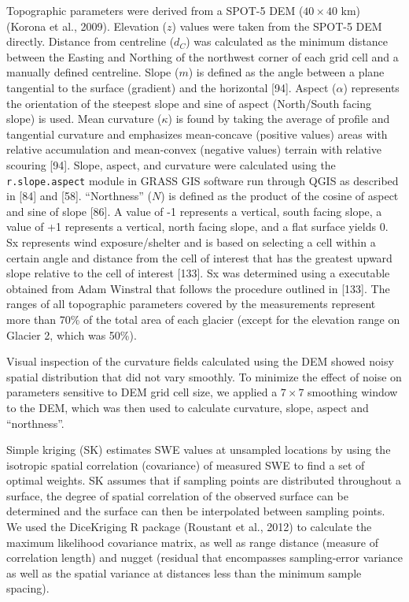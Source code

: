 \documentclass[twoside,twocolumn]{article}
\begin{document}
Topographic parameters were derived from a SPOT-5 DEM ($40\times40$ km) (Korona et al., 2009). Elevation ($z$) values were taken from the SPOT-5 DEM directly. Distance from centreline ($d_C$) was calculated as the minimum distance between the Easting
and Northing of the northwest corner of each grid cell and a manually defined centreline. Slope ($m$) is defined as the angle between a plane tangential to the surface (gradient) and the horizontal [94]. Aspect ($\alpha$) represents the orientation of the steepest slope and sine of aspect (North/South facing slope) is used. Mean curvature ($\kappa$) is found by taking the average of profile and tangential curvature and emphasizes mean-concave (positive values) areas with relative accumulation and mean-convex (negative values) terrain with relative scouring [94]. Slope, aspect, and curvature were calculated using the \texttt{r.slope.aspect} module in GRASS GIS software run through QGIS as described in [84] and [58].  ``Northness'' ($N$) is defined as the product of the cosine of aspect and sine of slope [86]. A value of -1 represents a vertical, south facing slope, a value of +1 represents a vertical, north facing slope, and a flat surface yields 0. Sx represents wind exposure/shelter and is based on selecting a cell within a certain angle and distance from the cell of interest that has the greatest upward slope relative to the cell of interest [133]. Sx was determined
using a executable obtained from Adam Winstral that follows the procedure outlined in
[133]. The ranges of all topographic parameters covered by the measurements represent more than 70\% of the total area of each glacier (except for the elevation range on Glacier 2, which was 50\%).

Visual inspection of the curvature fields calculated using the DEM showed noisy spatial
distribution that did not vary smoothly. To minimize the effect of noise on parameters sensitive to DEM grid cell size, we applied a $7\times7$ smoothing window to the DEM, which was then used to calculate curvature, slope, aspect and ``northness''.

Simple kriging (SK) estimates SWE values at unsampled locations by using the isotropic spatial correlation (covariance) of measured SWE to find a set of optimal weights. SK assumes that if sampling points are distributed throughout a surface, the degree of spatial correlation of the observed surface can be determined and the surface can then be interpolated between sampling points. We used the DiceKriging R package (Roustant et al., 2012) to calculate the maximum likelihood covariance matrix, as well as range distance (measure of correlation length) and nugget (residual that encompasses sampling-error variance as well as the spatial variance at distances less than the minimum sample spacing). 
\end{document}
